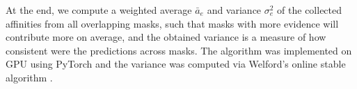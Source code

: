 At the end, we compute a weighted average $\bar{a}_e$ and variance $\sigma^2_e$ of the collected affinities from all overlapping masks, such that masks with more evidence will contribute more on average, and the obtained variance is a measure of how consistent were the predictions across masks. 
The algorithm was implemented on GPU using PyTorch and the variance was computed via Welford's online stable algorithm \cite{welford1962note}.






